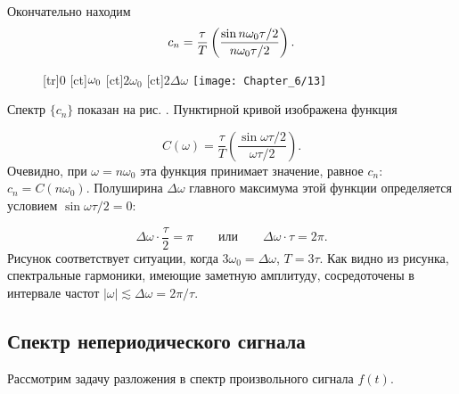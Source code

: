 %

Окончательно находим
\begin{equation}
	\eqmark{coef-Fourier-meander}
	c_n=\frac{\tau}{T}\left(\frac{\sin n\omega_0\tau/2}{n\omega_0\tau/2}\right).
\end{equation}

\begin{figure}[h!]
	\small
	[tr]{0}
	[ct]{$\vphantom{2}\omega_0$}
	[ct]{$2\omega_0$}
	[ct]{$2\Delta\omega$}
	\texttt{[image: Chapter\_6/13]}
	\caption{}
\end{figure}

Спектр $\{c_n\}$ показан на рис. . Пунктирной кривой изображена функция

\begin{equation*}
	C(\omega) =\frac{\tau}{T}\left(\frac{\sin\omega\tau/2}{\omega\tau/2}\right).
\end{equation*}
Очевидно, при $\omega=n\omega_0$ эта функция принимает значение, равное $c_n$: $c_n=C(n\omega_0)$. Полуширина $\Delta
\omega$ главного максимума этой функции определяется условием $\sin\omega\tau/2=0$:

\begin{equation*}
	\Delta\omega \cdot \frac{\tau}{2}=\pi\qquad \text{или} \qquad \Delta \omega \cdot \tau =2\pi.
\end{equation*}
Рисунок соответствует ситуации, когда $3\omega_0=\Delta\omega$, $T=3\tau$. Как видно из рисунка, спектральные гармоники,
имеющие заметную амплитуду, сосредоточены в интервале частот $|\omega|\lesssim \Delta\omega=2\pi/\tau$.

\subsection{Спектр непериодического сигнала}

Рассмотрим задачу разложения в спектр произвольного сигнала $f(t)$.

